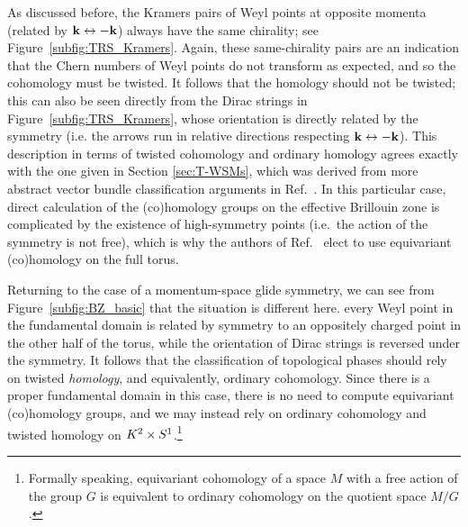 As discussed before,  the Kramers pairs of Weyl points at opposite momenta (related by $\vb{k}\leftrightarrow -\vb{k}$) always have the same chirality; see Figure~\ref{subfig:TRS_Kramers}.  %
Again, these same-chirality pairs are an indication that the Chern numbers of Weyl points do not transform as expected, and so the cohomology must be twisted. It follows that the homology should not be twisted; this can also be seen directly from the Dirac strings in Figure~\ref{subfig:TRS_Kramers}, whose orientation is directly related by the symmetry (i.e. the arrows run in relative directions respecting $\vb{k}\leftrightarrow-\vb{k}$). This description in terms of twisted cohomology and ordinary homology agrees exactly with the one given in Section \ref{sec:T-WSMs}, which was derived from more abstract vector bundle classification arguments in Ref.~\cite{Thiang_equivariant}. In this particular case, direct calculation of the (co)homology groups on the effective Brillouin zone is complicated by the existence of high-symmetry points (i.e.\ the action of the symmetry is not free), which is why the authors of Ref.~\cite{Thiang_equivariant} elect to use equivariant (co)homology on the full torus.

Returning to the case of a momentum-space glide symmetry, we can see from Figure~\ref{subfig:BZ_basic} that the situation is different here.  every Weyl point in the fundamental domain is related by symmetry to an oppositely charged point in the other half of the torus, while the orientation of Dirac strings is reversed under the symmetry. It follows that the classification of topological phases should rely on twisted \emph{homology}, and equivalently, ordinary cohomology. Since there is a proper fundamental domain in this case, there is no need to compute equivariant (co)homology groups, and we may instead rely on ordinary cohomology and twisted homology on $K^2\times S^1$.\footnote{\label{ft:eq_cohom}
	Formally speaking, equivariant cohomology of a space $M$ with a free action of the group $G$ is equivalent to ordinary cohomology on the quotient space $M/G$ \parencite[Cor. 9.6]{Tu_equivariant}.}

